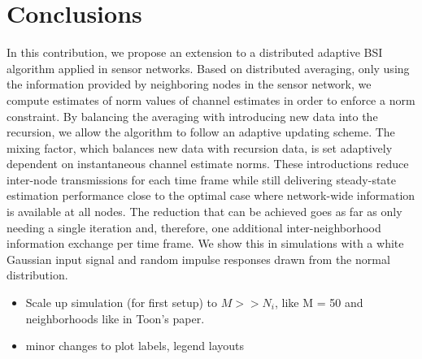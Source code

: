 \documentclass{article}
\begin{document}
\section[]{Conclusions}
\label{sec:conclusions}
In this contribution, we propose an extension to a distributed adaptive BSI algorithm applied in sensor networks.
Based on distributed averaging, only using the information provided by neighboring nodes in the sensor network, we compute estimates of norm values of channel estimates in order to enforce a norm constraint.
By balancing the averaging with introducing new data into the recursion, we allow the algorithm to follow an adaptive updating scheme.
The mixing factor, which balances new data with recursion data, is set adaptively dependent on instantaneous channel estimate norms.
These introductions reduce inter-node transmissions for each time frame while still delivering steady-state estimation performance close to the optimal case where network-wide information is available at all nodes.
The reduction that can be achieved goes as far as only needing a single iteration and, therefore, one additional inter-neighborhood information exchange per time frame.
We show this in simulations with a white Gaussian input signal and random impulse responses drawn from the normal distribution.
\begin{todo}
    \begin{itemize}
        \item Scale up simulation (for first setup) to \(M >> N_i\), like M = 50 and neighborhoods like in Toon's paper.
        \item minor changes to plot labels, legend layouts
    \end{itemize}
\end{todo}
\end{document}
